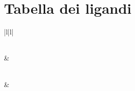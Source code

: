 \appendix

\chapter{Tabella dei ligandi}
\begin{small}
\begin{longtable}{|l|l|}
\caption{Tabella dei ligandi in input} \label{tab:Tabella dei Ligandi}\\

\hline {} & \\ \hline 
\endfirsthead

%
{{\bfseries \tablename\ \thetable{}}} \\
\hline {} & \\ \hline 
\endhead

\hline {} \\ \hline
\endfoot


\end{longtable}
\end{small}
